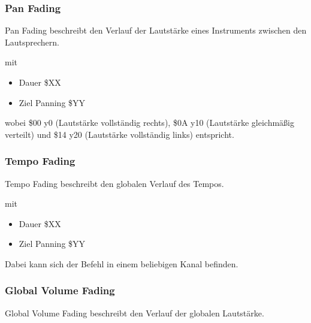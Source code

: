 \subsubsection{Pan Fading}

Pan Fading beschreibt den Verlauf der Lautstärke eines Instruments zwischen den Lautsprechern.

\medskip



\medskip

mit 

\begin{itemize}
	\item Dauer \$XX 
	\item Ziel Panning \$YY
\end{itemize}

wobei \$00 y0 (Lautstärke vollständig rechts), \$0A y10 (Lautstärke gleichmäßig verteilt) und \$14 y20 (Lautstärke vollständig links) entspricht.

\subsubsection{Tempo Fading}

Tempo Fading beschreibt den globalen Verlauf des Tempos.

\medskip



\medskip

mit 

\begin{itemize}
	\item Dauer \$XX 
	\item Ziel Panning \$YY
\end{itemize}

Dabei kann sich der Befehl in einem beliebigen Kanal befinden.

\subsubsection{Global Volume Fading}

Global Volume Fading beschreibt den Verlauf der globalen Lautstärke.

\medskip




